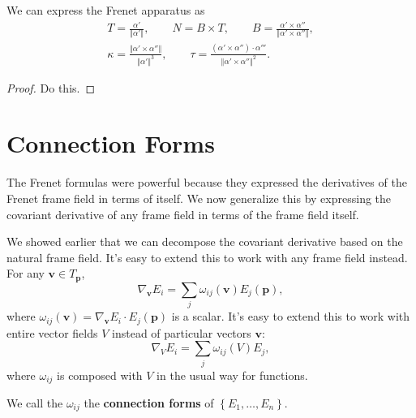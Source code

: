 \documentclass[10pt]{report}
\begin{document}
\begin{thrm}[]
We can express the Frenet apparatus as
\begin{gather*}
	T = \frac{\alpha'}{\Vert{\alpha'}\Vert} ,\quad\quad N = B \times T,\quad\quad B = \frac{\alpha' \times \alpha''}{\Vert{\alpha' \times \alpha''}\Vert} ,\\
	\kappa = \frac{\Vert{\alpha' \times \alpha''}\Vert}{\Vert{\alpha'}\Vert^3} ,\quad\quad \tau = \frac{(\alpha' \times \alpha'')\cdot \alpha'''}{\Vert{\alpha'\times \alpha''}\Vert^2} .
\end{gather*}
\end{thrm}
\begin{proof}
	{\color{red}Do this.}
\end{proof}


\section{Connection Forms}

The Frenet formulas were powerful because they expressed the derivatives of the Frenet frame field in terms of itself. We now generalize this by expressing the covariant derivative of any frame field in terms of the frame field itself.

We showed earlier that we can decompose the covariant derivative based on the natural frame field. It's easy to extend this to work with any frame field instead. For any $\mathbf{v} \in T_{\mathbf{p}}$,
\[
	\nabla_{\mathbf{v}}E_i = \sum_j \omega_{ij}(\mathbf{v}) E_j(\mathbf{p}),
\] where $\omega_{ij}(\mathbf{v}) = \nabla_{\mathbf{v}}E_i \cdot E_{j}(\mathbf{p})$ is a scalar. It's easy to extend this to work with entire vector fields $V$ instead of particular vectors $\mathbf{v}$:
\[
	\nabla_{V}E_i = \sum_j \omega_{ij}(V) E_j,
\] where $\omega_{ij}$ is composed with $V$ in the usual way for functions.

\begin{defn}[]
We call the $\omega_{ij}$ the \textbf{connection forms} of $\left\{ E_1, \dots, E_n \right\}$.
\end{defn}
\end{document}
